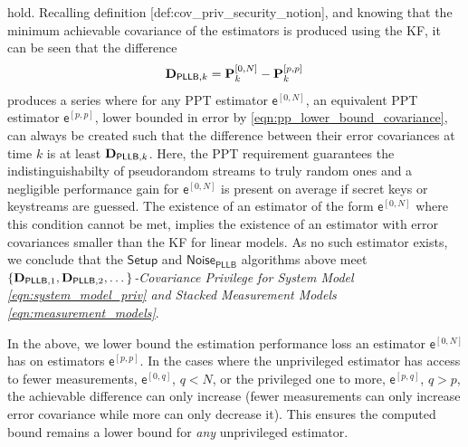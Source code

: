 hold. Recalling definition [def:cov\_priv\_security\_notion], and knowing that the minimum achievable covariance of the estimators is produced using the KF, it can be seen that the difference 
\begin{equation}\label{eqn:unpriv_priv_pllb_difference_series}
  {\ensuremath{{\mathbf{D}}}}_{\mathsf{PLLB},k} = {{\mathbf{P}}}_k^{[0,N]} - {{\mathbf{P}}}_k^{[p,p]}\,
\end{equation}
produces a series where for any PPT estimator $\mathsf{e}^{[0,N]}$, an equivalent PPT estimator $\mathsf{e}^{[p,p]}$, lower bounded in error by \eqref{eqn:pp_lower_bound_covariance}, can always be created such that the difference between their error covariances at time $k$ is at least ${{\mathbf{D}}}_{\mathsf{PLLB},k}$. Here, the PPT requirement guarantees the indistinguishabilty of pseudorandom streams to truly random ones and a negligible performance gain for $\mathsf{e}^{[0,N]}$ is present on average if secret keys or keystreams are guessed. The existence of an estimator of the form $\mathsf{e}^{[0,N]}$ where this condition cannot be met, implies the existence of an estimator with error covariances smaller than the KF for linear models. As no such estimator exists, we conclude that the $\mathsf{Setup}$ and $\mathsf{Noise_{\mathsf{PLLB}}}$ algorithms above meet \textit{$\{{{\mathbf{D}}}_{\mathsf{PLLB},1},{{\mathbf{D}}}_{\mathsf{PLLB},2},\dots\}$-Covariance Privilege for System Model \eqref{eqn:system_model_priv} and Stacked Measurement Models \eqref{eqn:measurement_models}}.

In the above, we lower bound the estimation performance loss an estimator $\mathsf{e}^{[0,N]}$ has on estimators $\mathsf{e}^{[p,p]}$. In the cases where the unprivileged estimator has access to fewer measurements, $\mathsf{e}^{[0,q]}$, $q<N$, or the privileged one to more, $\mathsf{e}^{[p,q]}$, $q>p$, the achievable difference can only increase (fewer measurements can only increase error covariance while more can only decrease it). This ensures the computed bound remains a lower bound for \textit{any} unprivileged estimator.

% 
% 

